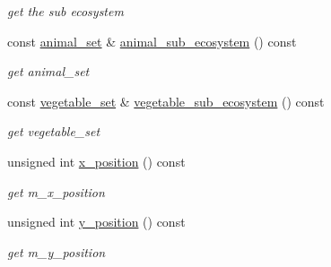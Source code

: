 \begin{DoxyCompactItemize}
\begin{DoxyCompactList}\small\item\em get the sub ecosystem \end{DoxyCompactList}\item 
\hypertarget{classSubsystemContainer_aa5df163b7162b4250dfd9c115392a545}{
const \hyperlink{classSubsystemContainer_a8f87e58293188f19a139b1f9ac21fe3e}{animal\_\-set} \& \hyperlink{classSubsystemContainer_aa5df163b7162b4250dfd9c115392a545}{animal\_\-sub\_\-ecosystem} () const }
\label{classSubsystemContainer_aa5df163b7162b4250dfd9c115392a545}

\begin{DoxyCompactList}\small\item\em get animal\_\-set \end{DoxyCompactList}\item 
\hypertarget{classSubsystemContainer_a755d4d2106c2c474dea5a6b0065f15f7}{
const \hyperlink{classSubsystemContainer_aa11de189765005941e3c055feceb3db0}{vegetable\_\-set} \& \hyperlink{classSubsystemContainer_a755d4d2106c2c474dea5a6b0065f15f7}{vegetable\_\-sub\_\-ecosystem} () const }
\label{classSubsystemContainer_a755d4d2106c2c474dea5a6b0065f15f7}

\begin{DoxyCompactList}\small\item\em get vegetable\_\-set \end{DoxyCompactList}\item 
\hypertarget{classSubsystemContainer_a317b9541923b6c520e17b7f901131537}{
unsigned int \hyperlink{classSubsystemContainer_a317b9541923b6c520e17b7f901131537}{x\_\-position} () const }
\label{classSubsystemContainer_a317b9541923b6c520e17b7f901131537}

\begin{DoxyCompactList}\small\item\em get m\_\-x\_\-position \end{DoxyCompactList}\item 
\hypertarget{classSubsystemContainer_aa74c3e4ccf46c4c8941e86ffa07a6926}{
unsigned int \hyperlink{classSubsystemContainer_aa74c3e4ccf46c4c8941e86ffa07a6926}{y\_\-position} () const }
\label{classSubsystemContainer_aa74c3e4ccf46c4c8941e86ffa07a6926}

\begin{DoxyCompactList}\small\item\em get m\_\-y\_\-position \end{DoxyCompactList}\end{DoxyCompactItemize}
